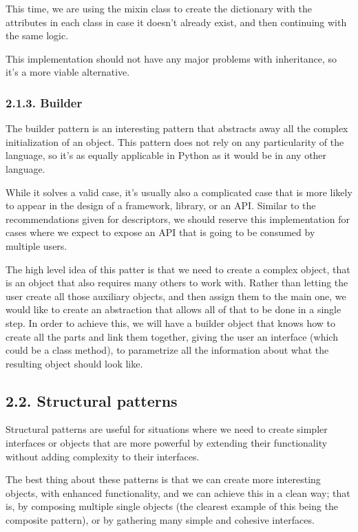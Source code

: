 \documentclass[a4paper,10pt,english]{sphinxmanual}
\begin{document}
This time, we are using the mixin class to create the dictionary with the attributes in each
class in case it doesn’t already exist, and then continuing with the same logic.

This implementation should not have any major problems with inheritance, so it’s a more
viable alternative.


\subsubsection{2.1.3. Builder}
\label{\detokenize{chapters/9_design_patterns/index:builder}}
The builder pattern is an interesting pattern that abstracts away all the complex
initialization of an object. This pattern does not rely on any particularity of the language, so
it’s as equally applicable in Python as it would be in any other language.

While it solves a valid case, it’s usually also a complicated case that is more likely to appear
in the design of a framework, library, or an API. Similar to the recommendations given for
descriptors, we should reserve this implementation for cases where we expect to expose an
API that is going to be consumed by multiple users.

The high level idea of this patter is that we need to create a complex object, that is an object
that also requires many others to work with. Rather than letting the user create all those
auxiliary objects, and then assign them to the main one, we would like to create an
abstraction that allows all of that to be done in a single step. In order to achieve this, we will
have a builder object that knows how to create all the parts and link them together, giving
the user an interface (which could be a class method), to parametrize all the information
about what the resulting object should look like.


\subsection{2.2. Structural patterns}
\label{\detokenize{chapters/9_design_patterns/index:structural-patterns}}
Structural patterns are useful for situations where we need to create simpler interfaces or
objects that are more powerful by extending their functionality without adding complexity
to their interfaces.

The best thing about these patterns is that we can create more interesting objects, with
enhanced functionality, and we can achieve this in a clean way; that is, by composing
multiple single objects (the clearest example of this being the composite pattern), or by
gathering many simple and cohesive interfaces.
\end{document}
